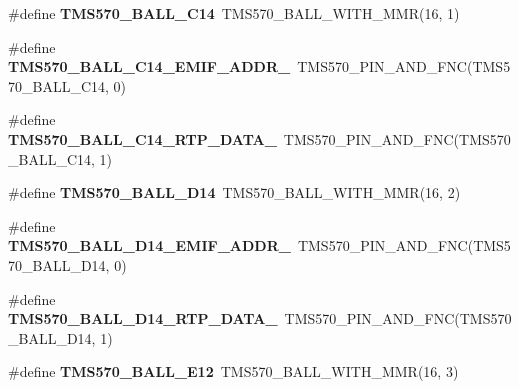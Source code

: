 \begin{DoxyCompactItemize}
\mbox{\label{tms570ls3137zwt-pins_8h_ad32eec5a7da1cc504cd15dffe4a2a5a9}} 
\#define {\bfseries T\+M\+S570\+\_\+\+B\+A\+L\+L\+\_\+\+C14}~T\+M\+S570\+\_\+\+B\+A\+L\+L\+\_\+\+W\+I\+T\+H\+\_\+\+M\+MR(16, 1)
\item 
\mbox{\label{tms570ls3137zwt-pins_8h_ac2e9aaded9cd9a9a0625109a22c184b9}} 
\#define {\bfseries T\+M\+S570\+\_\+\+B\+A\+L\+L\+\_\+\+C14\+\_\+\+E\+M\+I\+F\+\_\+\+A\+D\+D\+R\+\_}~T\+M\+S570\+\_\+\+P\+I\+N\+\_\+\+A\+N\+D\+\_\+\+F\+NC(T\+M\+S570\+\_\+\+B\+A\+L\+L\+\_\+\+C14, 0)
\item 
\mbox{\label{tms570ls3137zwt-pins_8h_a21bc8ea1d4bd0de3ec6c099b4eb86ab1}} 
\#define {\bfseries T\+M\+S570\+\_\+\+B\+A\+L\+L\+\_\+\+C14\+\_\+\+R\+T\+P\+\_\+\+D\+A\+T\+A\+\_}~T\+M\+S570\+\_\+\+P\+I\+N\+\_\+\+A\+N\+D\+\_\+\+F\+NC(T\+M\+S570\+\_\+\+B\+A\+L\+L\+\_\+\+C14, 1)
\item 
\mbox{\label{tms570ls3137zwt-pins_8h_a0b67269a8c32a1b0ab2fa43bb28636bf}} 
\#define {\bfseries T\+M\+S570\+\_\+\+B\+A\+L\+L\+\_\+\+D14}~T\+M\+S570\+\_\+\+B\+A\+L\+L\+\_\+\+W\+I\+T\+H\+\_\+\+M\+MR(16, 2)
\item 
\mbox{\label{tms570ls3137zwt-pins_8h_ac8995940e74ce5d7efcff3dba8483503}} 
\#define {\bfseries T\+M\+S570\+\_\+\+B\+A\+L\+L\+\_\+\+D14\+\_\+\+E\+M\+I\+F\+\_\+\+A\+D\+D\+R\+\_}~T\+M\+S570\+\_\+\+P\+I\+N\+\_\+\+A\+N\+D\+\_\+\+F\+NC(T\+M\+S570\+\_\+\+B\+A\+L\+L\+\_\+\+D14, 0)
\item 
\mbox{\label{tms570ls3137zwt-pins_8h_a7dcda5b9bc492c353fba5fffe871bdab}} 
\#define {\bfseries T\+M\+S570\+\_\+\+B\+A\+L\+L\+\_\+\+D14\+\_\+\+R\+T\+P\+\_\+\+D\+A\+T\+A\+\_}~T\+M\+S570\+\_\+\+P\+I\+N\+\_\+\+A\+N\+D\+\_\+\+F\+NC(T\+M\+S570\+\_\+\+B\+A\+L\+L\+\_\+\+D14, 1)
\item 
\mbox{\label{tms570ls3137zwt-pins_8h_a2cbc26ce5776a9c6e096314662c6d759}} 
\#define {\bfseries T\+M\+S570\+\_\+\+B\+A\+L\+L\+\_\+\+E12}~T\+M\+S570\+\_\+\+B\+A\+L\+L\+\_\+\+W\+I\+T\+H\+\_\+\+M\+MR(16, 3)
\item 
\mbox{\label{tms570ls3137zwt-pins_8h_a12b523ab84a7f4330e2bbaae41185acb}} 

\end{DoxyCompactItemize}
